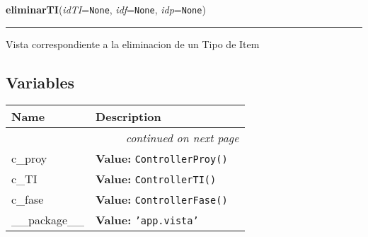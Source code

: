     \label{app:vista:vistaTI:eliminarTI}

    \vspace{0.5ex}

\hspace{.8\funcindent}\begin{boxedminipage}{\funcwidth}

    \raggedright \textbf{eliminarTI}(\textit{idTI}={\tt None}, \textit{idf}={\tt None}, \textit{idp}={\tt None})

    \vspace{-1.5ex}

    \rule{\textwidth}{0.5\fboxrule}
\setlength{\parskip}{2ex}
    Vista correspondiente a la eliminacion de un Tipo de Item

\setlength{\parskip}{1ex}
    \end{boxedminipage}



  \subsection{Variables}

    \vspace{-1cm}
\hspace{\varindent}\begin{longtable}{|p{\varnamewidth}|p{\vardescrwidth}|l}
\cline{1-2}
\cline{1-2} \centering \textbf{Name} & \centering \textbf{Description}& \\
\cline{1-2}
\endhead\cline{1-2}\multicolumn{3}{r}{\small\textit{continued on next page}}\\\endfoot\cline{1-2}
\endlastfoot\raggedright c\-\_\-p\-r\-o\-y\- & \raggedright \textbf{Value:} 
{\tt ControllerProy()}&\\
\cline{1-2}
\raggedright c\-\_\-T\-I\- & \raggedright \textbf{Value:} 
{\tt ControllerTI()}&\\
\cline{1-2}
\raggedright c\-\_\-f\-a\-s\-e\- & \raggedright \textbf{Value:} 
{\tt ControllerFase()}&\\
\cline{1-2}
\raggedright \_\-\_\-p\-a\-c\-k\-a\-g\-e\-\_\-\_\- & \raggedright \textbf{Value:} 
{\tt \texttt{'}\texttt{app.vista}\texttt{'}}&\\
\cline{1-2}
\end{longtable}


